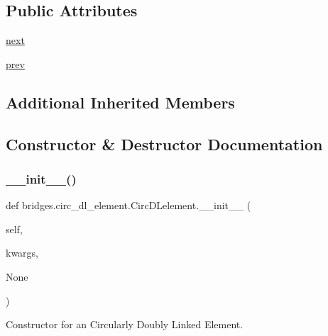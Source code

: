 \subsection*{Public Attributes}
\begin{DoxyCompactItemize}
\item 
\hyperlink{classbridges_1_1circ__dl__element_1_1_circ_d_lelement_a0f01f7ff433628bac241d7c069a476fa}{next}
\item 
\hyperlink{classbridges_1_1circ__dl__element_1_1_circ_d_lelement_a78ed845303a07e303bcbb39f015843d0}{prev}
\end{DoxyCompactItemize}
\subsection*{Additional Inherited Members}


\subsection{Constructor \& Destructor Documentation}
\mbox{\label{classbridges_1_1circ__dl__element_1_1_circ_d_lelement_a9536764f84d69deb9f7e03d6802a71b6}} 
\subsubsection{\texorpdfstring{\+\_\+\+\_\+init\+\_\+\+\_\+()}{\_\_init\_\_()}}
{\footnotesize\ttfamily def bridges.\+circ\+\_\+dl\+\_\+element.\+Circ\+D\+Lelement.\+\_\+\+\_\+init\+\_\+\+\_\+ (\begin{DoxyParamCaption}\item[{}]{self,  }\item[{}]{kwargs,  }\item[{}]{None }\end{DoxyParamCaption})}



Constructor for an Circularly Doubly Linked Element. 


